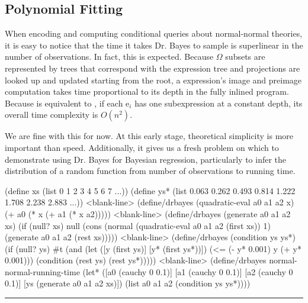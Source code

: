 \subsection{Polynomial Fitting}

When encoding and computing conditional queries about normal-normal theories, it is easy to notice that the time it takes Dr. Bayes to sample is superlinear in the number of observations.
In fact, this is expected.
Because $\Omega$ subsets are represented by trees that correspond with the expression tree and projections are looked up and updated starting from the root, a  expression's image and preimage computation takes time proportional to its depth in the fully inlined program.
Because  is equivalent to , if each e$_i$ has one  subexpression at a constant depth, its overall time complexity is $O(n^2)$.

We are fine with this for now.
At this early stage, theoretical simplicity is more important than speed.
Additionally, it gives us a fresh problem on which to demonstrate using Dr. Bayes for Bayesian regression, particularly to infer the distribution of a random function from number of observations to running time.

\begin{lrbox}{\codebox}
\begin{varwidth}{\textwidth}
\begin{center}\singlespacing
\begin{schemedisplay}
(define xs  (list     0     1     2     3     4     5     6     7 ...))
(define ys* (list 0.063 0.262 0.493 0.814 1.222 1.708 2.238 2.883 ...))
<blank-line>
(define/drbayes (quadratic-eval a0 a1 a2 x)
  (+ a0 (* x (+ a1 (* x a2)))))
<blank-line>
(define/drbayes (generate a0 a1 a2 xs)
  (if (null? xs) null (cons (normal (quadratic-eval a0 a1 a2 (first xs)) 1)
                            (generate a0 a1 a2 (rest xs)))))
<blank-line>
(define/drbayes (condition ys ys*)
  (if (null? ys) #t (and (let ([y   (first ys)]
                               [y*  (first ys*))])
                           (<= (- y* 0.001) y (+ y* 0.001)))
                         (condition (rest ys) (rest ys*)))))
<blank-line>  
(define/drbayes normal-normal-running-time
  (let* ([a0  (cauchy 0 0.1)]
         [a1  (cauchy 0 0.1)]
         [a2  (cauchy 0 0.1)]
         [ys  (generate a0 a1 a2 xs)])
    (list a0 a1 a2 (condition ys ys*))))
\end{schemedisplay}
\end{center}
\vspace{-0.75\baselineskip}
\hrule
\end{varwidth}
\end{lrbox}

